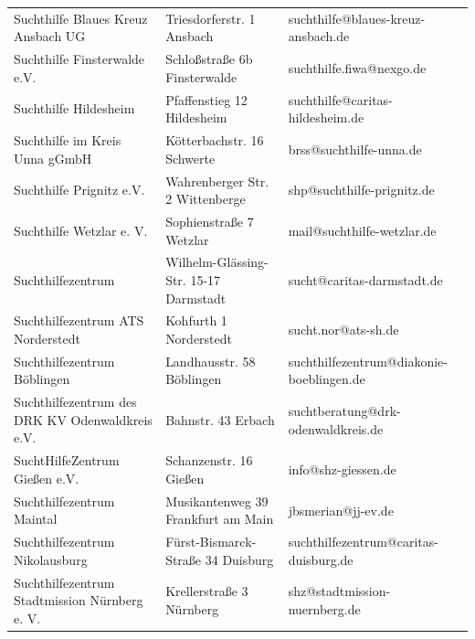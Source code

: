 {\begin{xltabular}{\textwidth} {
 >{\raggedright\arraybackslash}p{5cm}
 >{\raggedright\arraybackslash}X
 >{\raggedright\arraybackslash}p{5cm} }
Suchthilfe Blaues Kreuz Ansbach UG & Triesdorferstr. 1 Ansbach & suchthilfe@blaues-kreuz-ansbach.de \\
Suchthilfe Finsterwalde e.V. & Schloßstraße 6b Finsterwalde & suchthilfe.fiwa@nexgo.de \\
Suchthilfe Hildesheim & Pfaffenstieg 12 Hildesheim & suchthilfe@caritas-hildesheim.de \\
Suchthilfe im Kreis Unna gGmbH & Kötterbachstr. 16 Schwerte & brss@suchthilfe-unna.de \\
Suchthilfe Prignitz e.V. & Wahrenberger Str. 2 Wittenberge & shp@suchthilfe-prignitz.de \\
Suchthilfe Wetzlar e. V. & Sophienstraße 7 Wetzlar & mail@suchthilfe-wetzlar.de \\
Suchthilfezentrum & Wilhelm-Glässing-Str. 15-17 Darmstadt & sucht@caritas-darmstadt.de \\
Suchthilfezentrum ATS Norderstedt & Kohfurth 1 Norderstedt & sucht.nor@ats-sh.de \\
Suchthilfezentrum Böblingen & Landhausstr. 58 Böblingen & suchthilfezentrum@diakonie-boeblingen.de \\
Suchthilfezentrum des DRK KV Odenwaldkreis e.V. & Bahnstr. 43 Erbach & suchtberatung@drk-odenwaldkreis.de \\
SuchtHilfeZentrum Gießen e.V. & Schanzenstr. 16 Gießen & info@shz-giessen.de \\
Suchthilfezentrum Maintal & Musikantenweg 39 Frankfurt am Main & jbsmerian@jj-ev.de \\
Suchthilfezentrum Nikolausburg & Fürst-Bismarck-Straße 34 Duisburg & suchthilfezentrum@caritas-duisburg.de \\
Suchthilfezentrum Stadtmission Nürnberg e. V. & Krellerstraße 3 Nürnberg & shz@stadtmission-nuernberg.de \\

\end{xltabular}}
